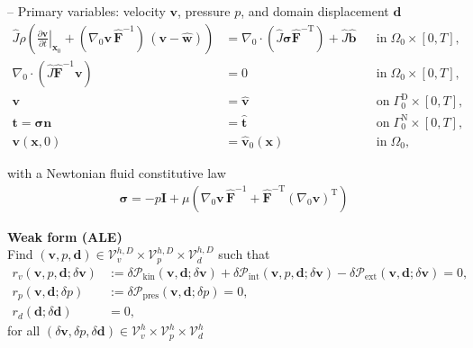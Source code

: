 \documentclass[a4paper,12pt]{report}
\newcommand{\Om}{\mathit{\Omega}}
\newcommand{\Gm}{\mathit{\Gamma}}
\begin{document}
-- Primary variables: velocity $\boldsymbol{v}$, pressure $p$, and domain displacement $\boldsymbol{d}$
\begin{equation}
\label{equation-fluid-ale-strong-form}
\begin{aligned}
\widehat{J}\rho\left(\left.\frac{\partial\boldsymbol{v}}{\partial t}\right|_{\boldsymbol{x}_{0}} + (\nabla_0\boldsymbol{v}\,\widehat{\boldsymbol{F}}^{-1})\,(\boldsymbol{v}-\widehat{\boldsymbol{w}})\right) &= \nabla_{0} \cdot\left(\widehat{J}\boldsymbol{\sigma} \widehat{\boldsymbol{F}}^{-\mathrm{T}}\right) + \widehat{J}\hat{\boldsymbol{b}} &&\text{in} \; \mathit{\Om}_0 \times [0, T],\\
\nabla_{0}\cdot\left(\widehat{J}\widehat{\boldsymbol{F}}^{-1}\boldsymbol{v}\right) &= 0 &&\text{in} \; \mathit{\Om}_0 \times [0, T],\\
\boldsymbol{v} &= \hat{\boldsymbol{v}} &&\text{on} \; \mathit{\Gm}_0^{\mathrm{D}} \times [0, T], \\
\boldsymbol{t} = \boldsymbol{\sigma}\boldsymbol{n} &= \hat{\boldsymbol{t}} &&\text{on} \; \mathit{\Gm}_0^{\mathrm{N}} \times [0, T], \\
\boldsymbol{v}(\boldsymbol{x},0) &= \hat{\boldsymbol{v}}_{0}(\boldsymbol{x}) &&\text{in} \; \mathit{\Om}_0,
\end{aligned}
\end{equation}

with a Newtonian fluid constitutive law
\begin{align}
\boldsymbol{\sigma} = -p \boldsymbol{I} + \mu \left(\nabla_0 \boldsymbol{v}\,\widehat{\boldsymbol{F}}^{-1} + \widehat{\boldsymbol{F}}^{-\mathrm{T}}(\nabla_0 \boldsymbol{v})^{\mathrm{T}}\right)
\end{align}

\textbf{Weak form (ALE)}\\
Find $(\boldsymbol{v},p,\boldsymbol{d}) \in \boldsymbol{\mathcal{V}}_{v}^{h,D} \times \mathcal{V}_{p}^{h,D} \times \boldsymbol{\mathcal{V}}_{d}^{h,D}$ such that
\begin{equation}
\label{equation-fluid-ale-weak-form}
\begin{aligned}
r_v(\boldsymbol{v},p,\boldsymbol{d};\delta\boldsymbol{v}) &:= \delta \mathcal{P}_{\mathrm{kin}}(\boldsymbol{v},\boldsymbol{d};\delta\boldsymbol{v}) + \delta \mathcal{P}_{\mathrm{int}}(\boldsymbol{v},p,\boldsymbol{d};\delta\boldsymbol{v}) - \delta \mathcal{P}_{\mathrm{ext}}(\boldsymbol{v},\boldsymbol{d};\delta\boldsymbol{v}) = 0, \\
r_p(\boldsymbol{v},\boldsymbol{d};\delta p) &:= \delta \mathcal{P}_{\mathrm{pres}}(\boldsymbol{v},\boldsymbol{d};\delta p) = 0, \\
r_{d}(\boldsymbol{d};\delta\boldsymbol{d}) &= 0,
\end{aligned}
\end{equation}
for all $(\delta\boldsymbol{v},\delta p,\delta\boldsymbol{d}) \in \boldsymbol{\mathcal{V}}_{v}^{h} \times \mathcal{V}_{p}^{h} \times \boldsymbol{\mathcal{V}}_{d}^{h}$
\end{document}
